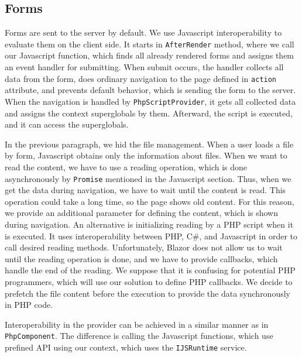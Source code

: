 \subsection{Forms}

Forms are sent to the server by default.
We use Javascript interoperability to evaluate them on the client side.
It starts in \texttt{AfterRender} method, where we call our Javascript function, which finds all already rendered forms and assigns them an event handler for submitting.
When submit occurs, the handler collects all data from the form, does ordinary navigation to the page defined in \texttt{action} attribute, and prevents default behavior, which is sending the form to the server.
When the navigation is handled by \texttt{PhpScriptProvider}, it gets all collected data and assigns the context superglobals by them.
Afterward, the script is executed, and it can access the superglobals.
\par
In the previous paragraph, we hid the file management.
When a user loads a file by form, Javascript obtains only the information about files. 
When we want to read the content, we have to use a reading operation, which is done asynchronously by \texttt{Promise} mentioned in the Javascript section.
Thus, when we get the data during navigation, we have to wait until the content is read.
This operation could take a long time, so the page shows old content.
For this reason, we provide an additional parameter for defining the content, which is shown during navigation.
An alternative is initializing reading by a PHP script when it is executed.
It uses interoperability between PHP, C\#, and Javascript in order to call desired reading methods.
Unfortunately, Blazor does not allow us to wait until the reading operation is done, and we have to provide callbacks, which handle the end of the reading.
We suppose that it is confusing for potential PHP programmers, which will use our solution to define PHP callbacks.
We decide to prefetch the file content before the execution to provide the data synchronously in PHP code.
\par
Interoperability in the provider can be achieved in a similar manner as in \texttt{PhpComponent}.
The difference is calling the Javascript functions, which use prefined API using our context, which uses the \texttt{IJSRuntime} service.


            
 